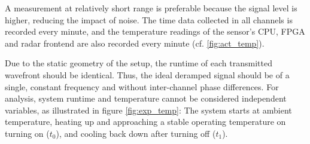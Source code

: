 A measurement at relatively short range is preferable because the signal level is higher, 
reducing the impact of noise. The time data collected in all channels is recorded every minute, 
and the temperature readings of the sensor's CPU, FPGA and radar frontend 
are also recorded every minute (cf. \ref{fig:act_temp}).

Due to the static geometry of the setup, the runtime of each transmitted wavefront should be identical.
Thus, the ideal deramped signal should be of a single, constant frequency and without inter-channel phase differences.
For analysis, system runtime and temperature cannot be considered independent variables, as illustrated in figure \ref{fig:exp_temp}:
The system starts at ambient temperature, heating up and approaching a stable operating temperature on turning on ($t_0$), and cooling back down after turning off ($t_1$).

